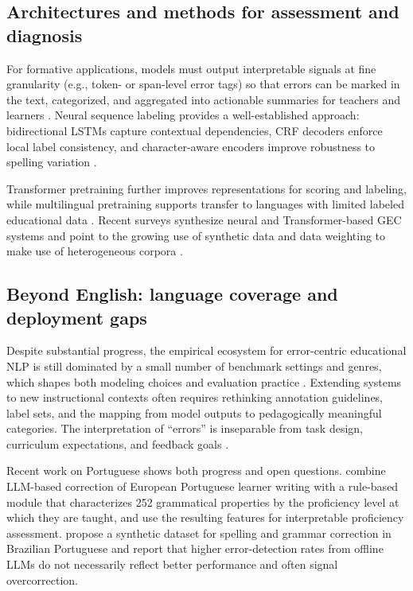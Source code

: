 \subsection{Architectures and methods for assessment and diagnosis}
\label{sec:sota_nlp_edu_methods}

For formative applications, models must output interpretable signals at fine granularity (e.g., token- or span-level error tags) so that errors can be marked in the text, categorized, and aggregated into actionable summaries for teachers and learners \parencite{ReiYannakoudakis2016,BryantFeliceBriscoe2017}. Neural sequence labeling provides a well-established approach: bidirectional LSTMs capture contextual dependencies, CRF decoders enforce local label consistency, and character-aware encoders improve robustness to spelling variation \parencite{HochreiterSchmidhuber1997,HuangXuYu2015,MaHovy2016}.

Transformer pretraining further improves representations for scoring and labeling, while multilingual pretraining supports transfer to languages with limited labeled educational data \parencite{Devlin2019,Liu2019RoBERTa,Conneau2020}. Recent surveys synthesize neural and Transformer-based GEC systems and point to the growing use of synthetic data and data weighting to make use of heterogeneous corpora \parencite{Bryant2023GECsurvey,Lichtarge2020}.

\subsection{Beyond English: language coverage and deployment gaps}
\label{sec:sota_nlp_edu_beyond_english}

Despite substantial progress, the empirical ecosystem for error-centric educational NLP is still dominated by a small number of benchmark settings and genres, which shapes both modeling choices and evaluation practice \parencite{Ng2014,Bryant2019,BryantFeliceBriscoe2017}. Extending systems to new instructional contexts often requires rethinking annotation guidelines, label sets, and the mapping from model outputs to pedagogically meaningful categories. The interpretation of ``errors'' is inseparable from task design, curriculum expectations, and feedback goals \parencite{Bryant2023GECsurvey,Woolf2010}.

Recent work on Portuguese shows both progress and open questions. \textcite{Akef2026} combine LLM-based correction of European Portuguese learner writing with a rule-based module that characterizes 252 grammatical properties by the proficiency level at which they are taught, and use the resulting features for interpretable proficiency assessment. \textcite{Cabral2026} propose a synthetic dataset for spelling and grammar correction in Brazilian Portuguese and report that higher error-detection rates from offline LLMs do not necessarily reflect better performance and often signal overcorrection.

